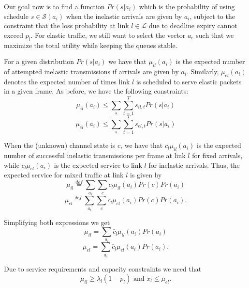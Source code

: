 \documentclass[conference]{IEEEtran}
\begin{document}
Our goal now is to find a function $Pr(s | a_i)$ which is the probability of using schedule $s \in \mathcal{S}(a_i)$ when the inelastic arrivals are given by $a_i$, subject to the constraint that the loss probability at link $l \in \mathcal{L}$ due to deadline expiry cannot exceed $p_l$. For elastic traffic, we still want to select the vector $a_e$ such that we maximize the total utility while keeping the queues stable.

For a given distribution $Pr(s | a_i)$ we have that $\mu_{il}(a_i)$ is the expected number of attempted inelastic transmissions if arrivals are given by $a_i$. Similarly, $\mu_{el}(a_i)$ denotes the expected number of times link $l$ is scheduled to serve elastic packets in a given frame. As before, we have the following constraints:
\begin{equation*}
\mu_{il}(a_i) \leq \sum\limits_{s} \sum_{t=1}^{T} s_{il,t} Pr(s | a_i)
\end{equation*}
\begin{equation*}
\mu_{el}(a_i) \leq \sum\limits_{s} \sum_{t=1}^{T} s_{el,t} Pr(s | a_i)
\end{equation*}



When the (unknown) channel state is $c$, we have that $c_l \mu_{il}(a_i)$ is the expected number of successful inelastic transmissions per frame at link $l$ for fixed arrivals, while $c_l \mu_{el}(a_i)$ is the expected service to link $l$ for inelastic arrivals. Thus, the expected service for mixed traffic at link $l$ is given by
\begin{equation*}
	\mu_{il} \stackrel{def}{=} \sum\limits_{a_i} \sum\limits_{c} c_l \mu_{il}(a_i) Pr(c) Pr(a_i)
\end{equation*}
\begin{equation*}
	\mu_{el} \stackrel{def}{=} \sum\limits_{a_i} \sum\limits_{c} c_l \mu_{el}(a_i) Pr(c) Pr(a_i).
\end{equation*}

Simplifying both expressions we get
\begin{equation*}
	\mu_{il} = \sum\limits_{a_i} \bar{c}_l \mu_{il}(a_i) Pr(a_i)
\end{equation*}
\begin{equation*}
	\mu_{el} = \sum\limits_{a_i} \bar{c}_l \mu_{el}(a_i) Pr(a_i).
\end{equation*}

Due to service requirements and capacity constraints we need that
\begin{equation*}
	\mu_{il} \geq \lambda_l(1-p_l) \mbox{ and } x_l \leq \mu_{el}.
\end{equation*}
\end{document}
